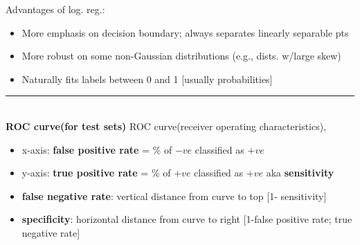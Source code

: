 \documentclass[10pt,landscape]{article}
\newcommand{\rulermy}{\rule{\columnwidth}{0.25pt}\\}
\begin{document}
\begin{multicols*}{3}
Advantages of log. reg.:
\begin{itemize}
	\item 
	More emphasis on decision boundary; always separates linearly separable pts\\
	\item
	More robust on some non-Gaussian distributions (e.g., dists. w/large skew)
	\item
	Naturally fits labels between 0 and 1 [usually probabilities]\\
\end{itemize}
\rulermy
\textbf{ROC curve(for test sets)}
ROC curve(receiver operating characteristics),\\
\begin{itemize}
	\item 
	x-axis: \textbf{false positive rate} = \% of $-ve$ classified as $+ve$\\
	\item
	y-axis: \textbf{true positive rate} = \% of $+ve$ classified as $+ve$ aka \textbf{sensitivity} \\
	\item
	\textbf{false negative rate}: vertical distance from curve to top [1- sensitivity]\\
	\item
	\textbf{specificity}: horizontal distance from curve to right [1-false positive rate; true negative rate]
\end{itemize}

\end{multicols*}
\end{document}
